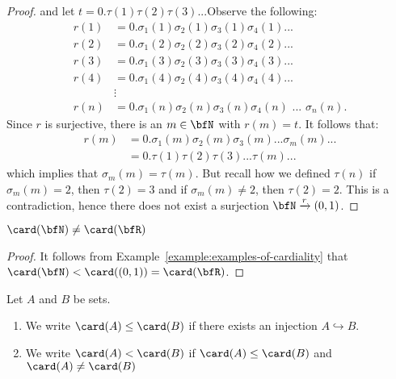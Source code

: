 \begin{proof}
            and let $t = 0.\tau(1)\tau(2)\tau(3)...$\hspace{5pt}Observe the following:
                \begin{equation*}
                \begin{split}
                    r(1) &= 0.\sigma_1(1) \sigma_2 (1) \sigma_3 (1) \sigma_4(1)... \\
                    r(2) &= 0.\sigma_1(2) \sigma_2 (2) \sigma_3 (2) \sigma_4 (2)... \\
                    r(3) &= 0.\sigma_1(3) \sigma_2 (3) \sigma_3 (3) \sigma_4 (3)... \\
                    r(4) &= 0.\sigma_1(4) \sigma_2 (4) \sigma_3 (4) \sigma_4 (4)... \\
                    &\vdots \\
                    r(n) &= 0.\sigma_1(n) \sigma_2 (n) \sigma_3 (n) \sigma_4 (n)\hspace{4pt}... \hspace{4pt}\sigma_n(n).
                \end{split}
                \end{equation*}
            Since $r$ is surjective, there is an $m \in \bfN$ with $r(m) = t$. It follows that:
                \begin{equation*}
                \begin{split}
                    r(m) &= 0.\sigma_1(m)\sigma_2(m)\sigma_3(m)...\sigma_m(m)... \\
                    & = 0.\tau(1)\tau(2)\tau(3)...\tau(m)...
                \end{split}
                \end{equation*}
            which implies that $\sigma_m(m) = \tau(m)$. But recall how we defined $\tau(n)$ \textemdash if $\sigma_m(m) = 2$, then $\tau(2) = 3$ and if $\sigma_m(m) \neq 2$, then $\tau(2) = 2$. This is a contradiction, hence there does not exist a surjection $\bfN \xrightarrow{r} (0,1)$.
        \end{proof}
    
    \begin{corollary}
        $\card(\bfN) \neq \card(\bfR)$
    \end{corollary}
        \begin{proof}
            It follows from Example~\ref{example:examples-of-cardiality} that $\card(\bfN) < \card((0,1)) = \card(\bfR)$.
        \end{proof}

    \begin{definition}
        Let $A$ and $B$ be sets.
        \begin{enumerate}[label = (\arabic*)]
            \item We write $\card(A) \leq \card(B)$ if there exists an injection $A \hookrightarrow B$.
            \item We write $\card(A) < \card(B)$ if $\card(A) \leq \card(B)$ and $\card(A) \neq \card(B)$
        \end{enumerate}
    \end{definition}

